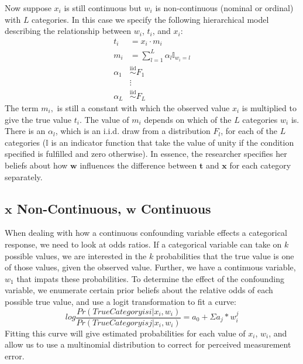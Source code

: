 \documentclass[fignum,letterpaper,12pt]{article}
\newcommand{\iid}{\stackrel{\mathrm{iid}}{\sim}}
\begin{document}
Now suppose $x_i$ is still continuous but $w_i$ is non-continuous (nominal or ordinal) with $L$ categories. In this case we specify the following hierarchical model describing the relationship between $w_i$, $t_i$, and $x_i$:
\begin{equation}
\begin{array}{rl}
t_i & = x_i \cdot m_i \\
m_{i} & = \sum_{l=1}^{L} \alpha_l \mathbb{I}_{w_i=l} \\
\alpha_1 & \iid F_1\\
& \vdots \\
\alpha_L & \iid F_L
\end{array}
\end{equation}
The term $m_i,$ is still a constant with which the observed value $x_i$ is multiplied to give the true value $t_i$. The value of $m_i$ depends on which of the $L$ categories $w_i$ is. There is an $\alpha_l$, which is an i.i.d. draw from a distribution $F_l$, for each of the $L$ categories ($\mathbb{I}$ is an indicator function that take the value of unity if the condition specified is fulfilled and zero otherwise). In essence, the researcher specifies her beliefs about how $\mathbf{w}$ influences the difference between $\mathbf{t}$ and $\mathbf{x}$ for each category separately.


\subsection{$\mathbf{x}$ Non-Continuous, $\mathbf{w}$ Continuous} \label{subsec:case3}
When dealing with how a continuous confounding variable effects a categorical response, we need to look at odds ratios. If a categorical variable can take on $k$ possible values, we are interested in the $k$ probabilities that the true value is one of those values, given the observed value. Further, we have a continuous variable, $w_1$ that impats these probabilities. To determine the effect of the confounding variable, we enumerate certain prior beliefs about the relative odds of each possible true value, and use a logit transformation to fit a curve:
\begin{equation}
log\frac{Pr(True Category is i|x_i,w_i)}{Pr(True Category is j|x_i,w_i)}=a_0+\Sigma a_j*w_i^j
\end{equation}
Fitting this curve will give estimated probabilities for each value of $x_i$, $w_i$, and allow us to use a multinomial distribution to correct for perceived measurement error.
\end{document}
